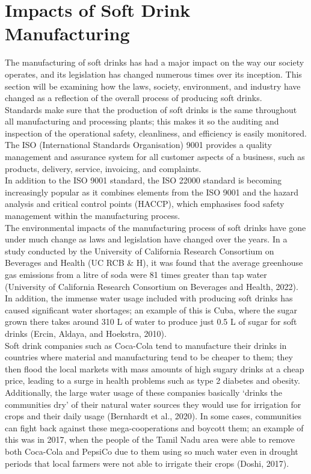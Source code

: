 \chapter{Impacts of Soft Drink Manufacturing}\label{ch04}

The manufacturing of soft drinks has had a major impact on the way our society operates, and its legislation has changed numerous times over its inception. This section will be examining how the laws, society, environment, and industry have changed as a reflection of the overall process of producing soft drinks. \\

Standards make sure that the production of soft drinks is the same throughout all manufacturing and processing plants; this makes it so the auditing and inspection of the operational safety, cleanliness, and efficiency is easily monitored.
The ISO (International Standards Organisation) 9001 provides a quality management and assurance system for all customer aspects of a business, such as products, delivery, service, invoicing, and complaints. \\

In addition to the ISO 9001 standard, the ISO 22000 standard is becoming increasingly popular as it combines elements from the ISO 9001 and the hazard analysis and critical control points (HACCP), which emphasises food safety management within the manufacturing process. \\

The environmental impacts of the manufacturing process of soft drinks have gone under much change as laws and legislation have changed over the years. In a study conducted by the University of California Research Consortium on Beverages and Health (UC RCB \& H), it was found that the average greenhouse gas emissions from a litre of soda were 81 times greater than tap water (University of California Research Consortium on Beverages and Health, 2022). In addition, the immense water usage included with producing soft drinks has caused significant water shortages; an example of this is Cuba, where the sugar grown there takes around 310 L of water to produce just 0.5 L of sugar for soft drinks (Ercin, Aldaya, and Hoekstra, 2010). \\

Soft drink companies such as Coca-Cola tend to manufacture their drinks in countries where material and manufacturing tend to be cheaper to them; they then flood the local markets with mass amounts of high sugary drinks at a cheap price, leading to a surge in health problems such as type 2 diabetes and obesity. \newpage Additionally, the large water usage of these companies basically ‘drinks the communities dry’ of their natural water sources they would use for irrigation for crops and their daily usage (Bernhardt et al., 2020). In some cases, communities can fight back against these mega-cooperations and boycott them; an example of this was in 2017, when the people of the Tamil Nadu area were able to remove both Coca-Cola and PepsiCo due to them using so much water even in drought periods that local farmers were not able to irrigate their crops (Doshi, 2017). \\

